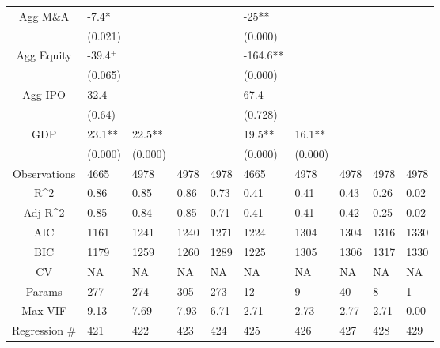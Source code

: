 \documentclass{article}
\begin{document}
\begin{table}[H]
\begin{tabular}{|clllllllll|}
  Agg M\&A & -7.4* &  &  &  & -25** &  &  &  &  \\ 
   & (0.021) &  &  &  & (0.000) &  &  &  &  \\ 
  Agg Equity & -39.4$^{+}$ &  &  &  & -164.6** &  &  &  &  \\ 
   & (0.065) &  &  &  & (0.000) &  &  &  &  \\ 
  Agg IPO & 32.4 &  &  &  & 67.4 &  &  &  &  \\ 
   & (0.64) &  &  &  & (0.728) &  &  &  &  \\ 
  GDP & 23.1** & 22.5** &  &  & 19.5** & 16.1** &  &  &  \\ 
   & (0.000) & (0.000) &  &  & (0.000) & (0.000) &  &  &  \\ 
  \hline 
 Observations & 4665 & 4978 & 4978 & 4978 & 4665 & 4978 & 4978 & 4978 & 4978 \\ 
  R^2 & 0.86 & 0.85 & 0.86 & 0.73 & 0.41 & 0.41 & 0.43 & 0.26 & 0.02 \\ 
  Adj R^2 & 0.85 & 0.84 & 0.85 & 0.71 & 0.41 & 0.41 & 0.42 & 0.25 & 0.02 \\ 
  AIC & 1161 & 1241 & 1240 & 1271 & 1224 & 1304 & 1304 & 1316 & 1330 \\ 
  BIC & 1179 & 1259 & 1260 & 1289 & 1225 & 1305 & 1306 & 1317 & 1330 \\ 
  CV & NA & NA & NA & NA & NA & NA & NA & NA & NA \\ 
  Params & 277 & 274 & 305 & 273 & 12 & 9 & 40 & 8 & 1 \\ 
  Max VIF & 9.13 & 7.69 & 7.93 & 6.71 & 2.71 & 2.73 & 2.77 & 2.71 & 0.00 \\ 
  Regression \# & 421 & 422 & 423 & 424 & 425 & 426 & 427 & 428 & 429 \\ 
   \hline
\end{tabular}
 
\end{table}
\end{document}
